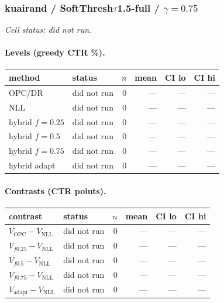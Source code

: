 \documentclass[10pt,a4paper]{article}
\begin{document}
\subsubsection{kuairand / SoftThresh$\tau$1.5-full / $\gamma=0.75$}
\emph{Cell status: did not run}.
\paragraph{Levels (greedy CTR \%).}
{\centering\small\begin{tabular}{llrrrr}
\toprule method & status & $n$ & mean & CI lo & CI hi \\
\midrule
OPC/DR & did not run & 0 & --- & --- & --- \\
NLL & did not run & 0 & --- & --- & --- \\
hybrid $f{=}0.25$ & did not run & 0 & --- & --- & --- \\
hybrid $f{=}0.5$ & did not run & 0 & --- & --- & --- \\
hybrid $f{=}0.75$ & did not run & 0 & --- & --- & --- \\
hybrid adapt & did not run & 0 & --- & --- & --- \\
\bottomrule\end{tabular}\par}
\paragraph{Contrasts (CTR points).}
{\centering\small\begin{tabular}{llrrrr}
\toprule contrast & status & $n$ & mean & CI lo & CI hi \\
\midrule
$V_{\mathrm{OPC}}-V_{\mathrm{NLL}}$ & did not run & 0 & --- & --- & --- \\
$V_{f0.25}-V_{\mathrm{NLL}}$ & did not run & 0 & --- & --- & --- \\
$V_{f0.5}-V_{\mathrm{NLL}}$ & did not run & 0 & --- & --- & --- \\
$V_{f0.75}-V_{\mathrm{NLL}}$ & did not run & 0 & --- & --- & --- \\
$V_{\mathrm{adapt}}-V_{\mathrm{NLL}}$ & did not run & 0 & --- & --- & --- \\
\bottomrule\end{tabular}\par}
\end{document}
